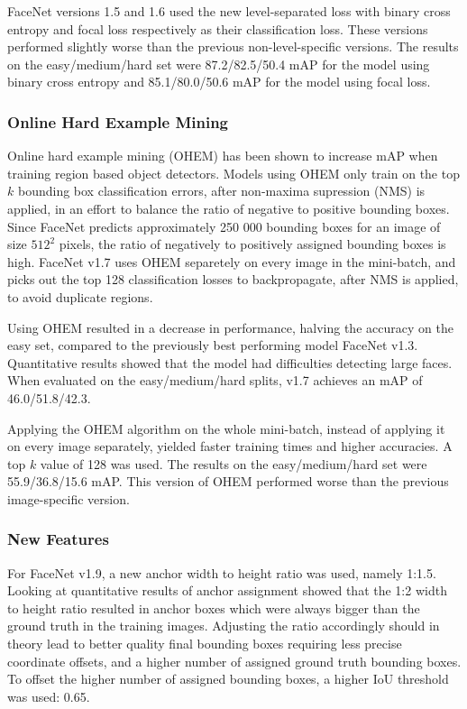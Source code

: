 \documentclass[paperwidth=48in,paperheight=48in, fontscale=0.4166666666666, landscape]{baposter}
\begin{document}
\begin{poster}
{FaceNet versions 1.5 and 1.6 used the new level-separated loss with binary cross entropy and focal loss respectively as their classification loss. These versions performed slightly worse than the previous non-level-specific versions. The results on the easy/medium/hard set were 87.2/82.5/50.4 mAP for the model using binary cross entropy and 85.1/80.0/50.6 mAP for the model using focal loss.

\subsubsection{Online Hard Example Mining}
Online hard example mining (OHEM) \cite{ohem} has been shown to increase mAP when training region based object detectors. Models using OHEM only train on the top $k$ bounding box classification errors, after non-maxima supression (NMS) is applied, in an effort to balance the ratio of negative to positive bounding boxes. Since FaceNet predicts approximately 250 000 bounding boxes for an image of size $512^2$ pixels, the ratio of negatively to positively assigned bounding boxes is high. FaceNet v1.7 uses OHEM separetely on every image in the mini-batch, and picks out the top 128 classification losses to backpropagate, after NMS is applied, to avoid duplicate regions.

Using OHEM resulted in a decrease in performance, halving the accuracy on the easy set, compared to the previously best performing model FaceNet v1.3. Quantitative results showed that the model had difficulties detecting large faces. When evaluated on the easy/medium/hard splits, v1.7 achieves an mAP of 46.0/51.8/42.3.

Applying the OHEM algorithm on the whole mini-batch, instead of applying it on every image separately, yielded faster training times and higher accuracies. A top $k$ value of 128 was used. The results on the easy/medium/hard set were 55.9/36.8/15.6 mAP. This version of OHEM performed worse than the previous image-specific version.

\subsubsection{New Features}
For FaceNet v1.9, a new anchor width to height ratio was used, namely 1:1.5. Looking at quantitative results of anchor assignment showed that the 1:2 width to height ratio resulted in anchor boxes which were always bigger than the ground truth in the training images. Adjusting the ratio accordingly should in theory lead to better quality final bounding boxes requiring less precise coordinate offsets, and a higher number of assigned ground truth bounding boxes. To offset the higher number of assigned bounding boxes, a higher IoU threshold was used: 0.65.

}
\end{poster}
\end{document}
